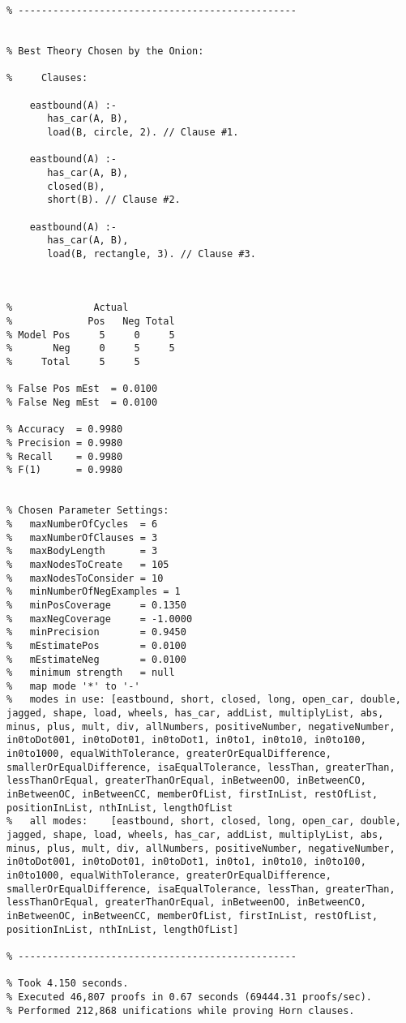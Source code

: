\documentclass{article}
\begin{document}
\begin{verbatim}
% ------------------------------------------------


% Best Theory Chosen by the Onion:
    
%     Clauses:

    eastbound(A) :- 
       has_car(A, B),
       load(B, circle, 2). // Clause #1.

    eastbound(A) :- 
       has_car(A, B),
       closed(B),
       short(B). // Clause #2.

    eastbound(A) :- 
       has_car(A, B),
       load(B, rectangle, 3). // Clause #3.



%              Actual
%             Pos   Neg Total
% Model Pos     5     0     5
%       Neg     0     5     5
%     Total     5     5

% False Pos mEst  = 0.0100
% False Neg mEst  = 0.0100

% Accuracy  = 0.9980
% Precision = 0.9980
% Recall    = 0.9980
% F(1)      = 0.9980


% Chosen Parameter Settings:
%   maxNumberOfCycles  = 6
%   maxNumberOfClauses = 3
%   maxBodyLength      = 3
%   maxNodesToCreate   = 105
%   maxNodesToConsider = 10
%   minNumberOfNegExamples = 1
%   minPosCoverage     = 0.1350
%   maxNegCoverage     = -1.0000
%   minPrecision       = 0.9450
%   mEstimatePos       = 0.0100
%   mEstimateNeg       = 0.0100
%   minimum strength   = null
%   map mode '*' to '-'
%   modes in use: [eastbound, short, closed, long, open_car, double, 
jagged, shape, load, wheels, has_car, addList, multiplyList, abs, 
minus, plus, mult, div, allNumbers, positiveNumber, negativeNumber, 
in0toDot001, in0toDot01, in0toDot1, in0to1, in0to10, in0to100, 
in0to1000, equalWithTolerance, greaterOrEqualDifference, 
smallerOrEqualDifference, isaEqualTolerance, lessThan, greaterThan, 
lessThanOrEqual, greaterThanOrEqual, inBetweenOO, inBetweenCO, 
inBetweenOC, inBetweenCC, memberOfList, firstInList, restOfList, 
positionInList, nthInList, lengthOfList
%   all modes:    [eastbound, short, closed, long, open_car, double, 
jagged, shape, load, wheels, has_car, addList, multiplyList, abs, 
minus, plus, mult, div, allNumbers, positiveNumber, negativeNumber, 
in0toDot001, in0toDot01, in0toDot1, in0to1, in0to10, in0to100, 
in0to1000, equalWithTolerance, greaterOrEqualDifference, 
smallerOrEqualDifference, isaEqualTolerance, lessThan, greaterThan, 
lessThanOrEqual, greaterThanOrEqual, inBetweenOO, inBetweenCO, 
inBetweenOC, inBetweenCC, memberOfList, firstInList, restOfList, 
positionInList, nthInList, lengthOfList]

% ------------------------------------------------

% Took 4.150 seconds.
% Executed 46,807 proofs in 0.67 seconds (69444.31 proofs/sec).
% Performed 212,868 unifications while proving Horn clauses.
\end{verbatim}
\end{document}
